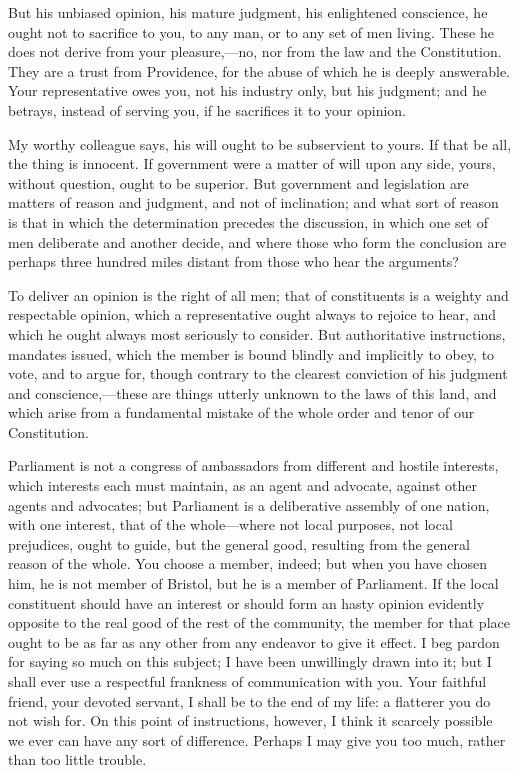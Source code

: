 But his unbiased opinion, his mature judgment, his enlightened conscience, he ought not to sacrifice to you, to any man, or to any set of men living. These he does not derive from your pleasure,—no, nor from the law and the Constitution. They are a trust from Providence, for the abuse of which he is deeply answerable. Your representative owes you, not his industry only, but his judgment; and he betrays, instead of serving you, if he sacrifices it to your opinion.

My worthy colleague says, his will ought to be subservient to yours. If that be all, the thing is innocent. If government were a matter of will upon any side, yours, without question, ought to be superior. But government and legislation are matters of reason and judgment, and not of inclination; and what sort of reason is that in which the determination precedes the discussion, in which one set of men deliberate and another decide, and where those who form the conclusion are perhaps three hundred miles distant from those who hear the arguments?

To deliver an opinion is the right of all men; that of constituents is a weighty and respectable opinion, which a representative ought always to rejoice to hear, and which he ought always most seriously to consider. But authoritative instructions, mandates issued, which the member is bound blindly and implicitly to obey, to vote, and to argue for, though contrary to the clearest conviction of his judgment and conscience,—these are things utterly unknown to the laws of this land, and which arise from a fundamental mistake of the whole order and tenor of our Constitution.

Parliament is not a congress of ambassadors from different and hostile interests, which interests each must maintain, as an agent and advocate, against other agents and advocates; but Parliament is a deliberative assembly of one nation, with one interest, that of the whole—where not local purposes, not local prejudices, ought to guide, but the general good, resulting from the general reason of the whole. You choose a member, indeed; but when you have chosen him, he is not member of Bristol, but he is a member of Parliament. If the local constituent should have an interest or should form an hasty opinion evidently opposite to the real good of the rest of the community, the member for that place ought to be as far as any other from any endeavor to give it effect. I beg pardon for saying so much on this subject; I have been unwillingly drawn into it; but I shall ever use a respectful frankness of communication with you. Your faithful friend, your devoted servant, I shall be to the end of my life: a flatterer you do not wish for. On this point of instructions, however, I think it scarcely possible we ever can have any sort of difference. Perhaps I may give you too much, rather than too little trouble.

